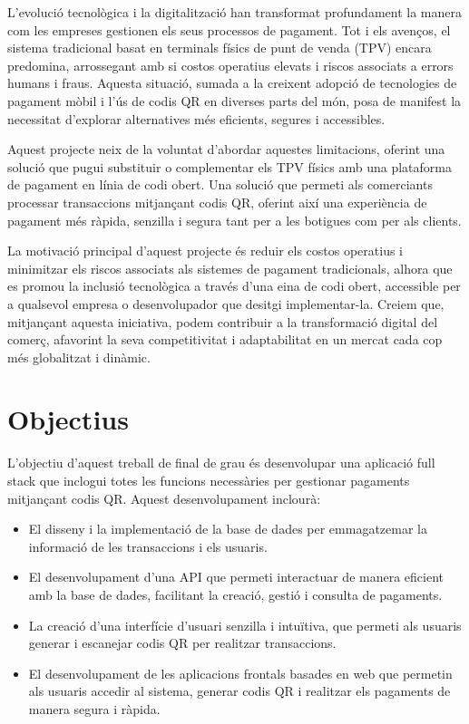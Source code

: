 \documentclass[a4paper,12pt,twoside]{ThesisStyle}
\begin{document}
L’evolució tecnològica i la digitalització han transformat profundament la manera com les empreses gestionen els seus processos de pagament. Tot i els avenços, el sistema tradicional basat en terminals físics de punt de venda (TPV) encara predomina, arrossegant amb si costos operatius elevats i riscos associats a errors humans i fraus. Aquesta situació, sumada a la creixent adopció de tecnologies de pagament mòbil i l’ús de codis QR en diverses parts del món, posa de manifest la necessitat d’explorar alternatives més eficients, segures i accessibles.

Aquest projecte neix de la voluntat d’abordar aquestes limitacions, oferint una solució que pugui substituir o complementar els TPV físics amb una plataforma de pagament en línia de codi obert. Una solució que permeti als comerciants processar transaccions mitjançant codis QR, oferint així una experiència de pagament més ràpida, senzilla i segura tant per a les botigues com per als clients.

La motivació principal d’aquest projecte és reduir els costos operatius i minimitzar els riscos associats als sistemes de pagament tradicionals, alhora que es promou la inclusió tecnològica a través d’una eina de codi obert, accessible per a qualsevol empresa o desenvolupador que desitgi implementar-la. Creiem que, mitjançant aquesta iniciativa, podem contribuir a la transformació digital del comerç, afavorint la seva competitivitat i adaptabilitat en un mercat cada cop més globalitzat i dinàmic.

\section{Objectius}
\label{subsubsec:objectius}

L'objectiu d'aquest treball de final de grau és desenvolupar una aplicació full stack que inclogui totes les funcions necessàries per gestionar pagaments mitjançant codis QR. Aquest desenvolupament inclourà:

\begin{itemize}
  \item El disseny i la implementació de la base de dades per emmagatzemar la informació de les transaccions i els usuaris.
  \item El desenvolupament d'una API que permeti interactuar de manera eficient amb la base de dades, facilitant la creació, gestió i consulta de pagaments.
  \item La creació d'una interfície d'usuari senzilla i intuïtiva, que permeti als usuaris generar i escanejar codis QR per realitzar transaccions.
  \item El desenvolupament de les aplicacions frontals basades en web que permetin als usuaris accedir al sistema, generar codis QR i realitzar els pagaments de manera segura i ràpida.
\end{itemize}
\end{document}
